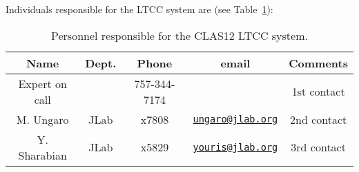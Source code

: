 Individuals responsible for the LTCC system are (see Table~\ref{tb:ltcc}):

\begin{table}[!htb]
\centering
\begin{tabular}{|c|c|c|c|c|} \hline
Name           & Dept.& Phone        & email & Comments \\ \hline
Expert on call &      & 757-344-7174 &       & 1st contact \\ \hline
M. Ungaro      & JLab & x7808 &\href{mailto:ungaro@jlab.org}{\nolinkurl{ungaro@jlab.org}}&2nd contact \\ \hline
Y. Sharabian   & JLab & x5829 &\href{mailto:youris@jlab.org}{\nolinkurl{youris@jlab.org}}&3rd contact \\ \hline
 \end{tabular}
\caption{Personnel responsible for the CLAS12 LTCC system.} 
\label{tb:ltcc}
\end{table}

